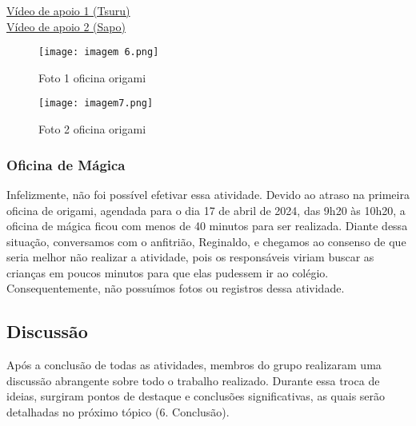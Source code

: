 \documentclass[a4paper,12pt]{article}
\begin{document}
\vspace{1cm}

\href{https://youtu.be/pzS0ToWZ9DA?si=ObnPbtDY5x3C888C}{Vídeo de apoio 1 (Tsuru)}\\

\href{https://youtu.be/wMP6qhHYKFE?si=oCtZ1KJRkNBfFcck}{Vídeo de apoio 2 (Sapo)}\\

\begin{figure}[h]
    \centering
    \texttt{[image: imagem 6.png]}
    \caption{Foto 1 oficina origami}
    \label{fig:foto1505}
\end{figure}

\vspace{1cm}

\begin{figure}[h]
    \centering
    \texttt{[image: imagem7.png]}
    \caption{Foto 2 oficina origami}
    \label{fig:foto1505}
\end{figure}

\newpage

\subsubsection{Oficina de Mágica}
Infelizmente, não foi possível efetivar essa atividade. Devido ao atraso na primeira oficina de origami, agendada para o dia 17 de abril de 2024, das 9h20 às 10h20, a oficina de mágica ficou com menos de 40 minutos para ser realizada. Diante dessa situação, conversamos com o anfitrião, Reginaldo, e chegamos ao consenso de que seria melhor não realizar a atividade, pois os responsáveis viriam buscar as crianças em poucos minutos para que elas pudessem ir ao colégio. Consequentemente, não possuímos fotos ou registros dessa atividade.

\vspace{0.5cm}
\subsection{\Large{Discussão}}
Após a conclusão de todas as atividades, membros do grupo realizaram uma discussão abrangente sobre todo o trabalho realizado. Durante essa troca de ideias, surgiram pontos de destaque e conclusões significativas, as quais serão detalhadas no próximo tópico (6. Conclusão).

\newpage{}
\end{document}
